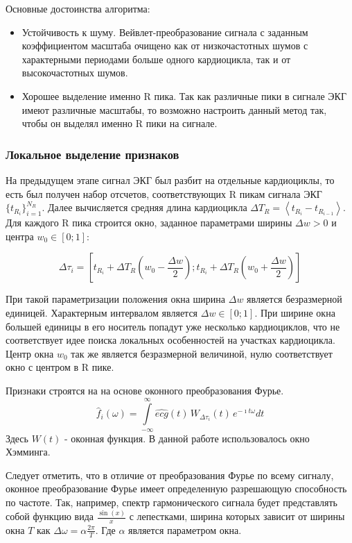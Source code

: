 \documentclass[a4paper,12pt]{extarticle}
\begin{document}
Основные достоинства алгоритма:
\begin{itemize}
    \item Устойчивость к шуму. Вейвлет-преобразование сигнала с заданным коэффициентом масштаба очищено как от низкочастотных шумов с характерными периодами больше одного кардиоцикла, так и от высокочастотных шумов.
    \item Хорошее выделение именно R пика. Так как различные пики в сигнале ЭКГ имеют различные масштабы, то возможно настроить данный метод так, чтобы он выделял именно R пики на сигнале.
\end{itemize}

\subsubsection{Локальное выделение признаков}
\label{sssec:LocalFeaturesTheory}
На предыдущем этапе сигнал ЭКГ был разбит на отдельные кардиоциклы, то есть был получен набор отсчетов, соответствующих R пикам сигнала ЭКГ $\{t_{R_i}\}_{i=1}^{N_R}$. Далее вычисляется средняя длина кардиоцикла $\Delta T_R = \left< t_{R_i} - t_{R_{i-1}} \right>$. Для каждого R пика строится окно, заданное параметрами ширины $\Delta w > 0$ и центра $w_0 \in [0;1]$:

$$ \Delta \tau_i = [t_{R_i} + \Delta T_R(w_0 - \frac{\Delta w}{2}); t_{R_i} + \Delta T_R(w_0 + \frac{\Delta w}{2})] $$

При такой параметризации положения окна ширина $\Delta w$ является безразмерной единицей. Характерным интервалом является $\Delta w \in [0; 1]$. При ширине окна большей единицы в его носитель попадут уже несколько кардиоциклов, что не соответствует идее поиска локальных особенностей на участках кардиоцикла. Центр окна $w_0$ так же является безразмерной величиной, нулю соответствует окно с центром в R пике.

Признаки строятся на на основе оконного преобразования Фурье.
$$\widehat{f}_i(\omega) = \int\limits_{-\infty}^{\infty} \widehat{ecg}(t)\,W_{\Delta \tau_i}(t)\, e^{-\imath t \omega} dt$$
Здесь $W(t)$ - оконная функция. В данной работе использовалось окно Хэмминга.

Следует отметить, что в отличие от преобразования Фурье по всему сигналу, оконное преобразование Фурье имеет определенную разрешающую способность по частоте. Так, например, спектр гармонического сигнала будет представлять собой функцию вида $\frac{\sin(x)}{x}$ с лепестками, ширина которых зависит от ширины окна $T$ как $\Delta \omega = \alpha \frac{2\pi}{T}$. Где $\alpha$ является параметром окна.
\end{document}
